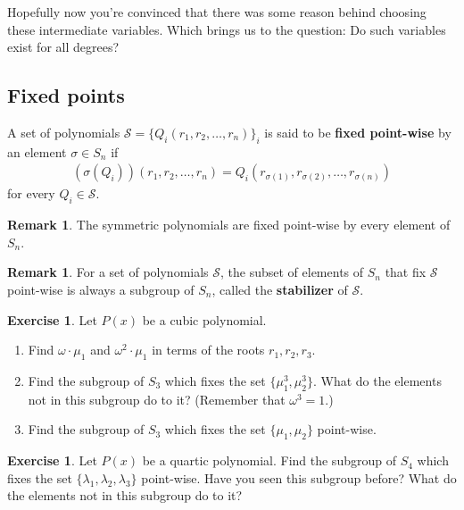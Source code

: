 \documentclass[reqno, 12pt, letter]{article}
\theoremstyle{plain}
\theoremstyle{definition}
\newtheorem{remark}[theorem]{Remark}
\newtheorem{exercise}[theorem]{Exercise}
\theoremstyle{remark}
\numberwithin{equation}{section}
\begin{document}
	Hopefully now you're convinced that there was some reason behind choosing these intermediate variables. Which brings us to the question: Do such variables exist for all degrees?
	
	
	
	
	
	
	\subsection{Fixed points}
		A set of polynomials $ \mathscr{S} = \{ Q_i(r_1, r_2, \dots, r_n) \}_i$ is said to be \textbf{fixed point-wise} by an element $ \sigma \in S_n$ if 
			\begin{align*}
			(\sigma(Q_i))(r_1, r_2, \dots, r_n) = Q_i(r_{\sigma(1)}, r_{\sigma(2)}, \dots, r_{\sigma(n)})
			\end{align*}
		for every $ Q_i \in \mathscr{S}$. 
		
		\begin{remark}
			The symmetric polynomials are fixed point-wise by every element of $ S_n$. 
		\end{remark}
		
		\begin{remark}
			For a set of polynomials $ \mathscr{S}$, the subset of elements of $ S_n$ that fix $ \mathscr{S}$ point-wise is always a subgroup of $ S_n$, called the \textbf{stabilizer} of $ \mathscr{S}$.
		\end{remark}
		
		\begin{exercise} Let $ P(x)$ be a cubic polynomial. 
			\begin{enumerate}

				\item Find $ \omega \cdot \mu_1$ and $ \omega^2\cdot \mu_1$ in terms of the roots $ r_1, r_2, r_3$.
				\item Find the subgroup of $ S_3$ which fixes the set $\{ \mu_1^3, \mu_2^3 \}$.
				 What do the elements not in this subgroup do to it? (Remember that $ \omega^3 = 1$.)
				\item Find the subgroup of $ S_3$ which fixes the set $\{ \mu_1, \mu_2 \}$ point-wise.
			\end{enumerate}
		\end{exercise}
		
		\begin{exercise}
			Let $ P(x)$ be a quartic polynomial. Find the subgroup of $ S_4$ which fixes the set $ \{ \lambda_1,  \lambda_2, \lambda_3 \}$ point-wise. Have you seen this subgroup before? What do the elements not in this subgroup do to it?
		\end{exercise}
			
\end{document}
